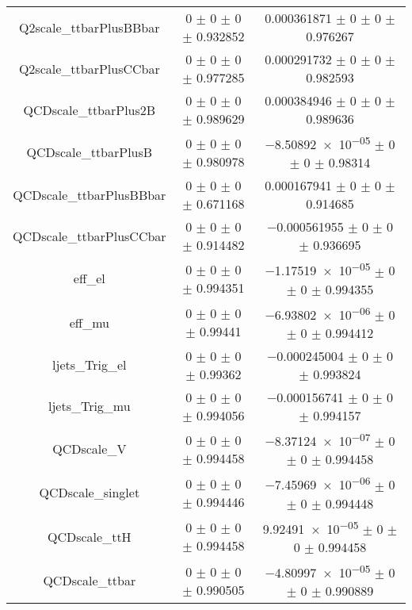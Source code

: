 \begin{table}
\begin{tabular}{ccc}
Q2scale\_ttbarPlusBBbar & \num{0} $\pm$ \num{0} $\pm$ \num{0} $\pm$ \num{0.932852} & \num{0.000361871} $\pm$ \num{0} $\pm$ \num{0} $\pm$ \num{0.976267}\\
Q2scale\_ttbarPlusCCbar & \num{0} $\pm$ \num{0} $\pm$ \num{0} $\pm$ \num{0.977285} & \num{0.000291732} $\pm$ \num{0} $\pm$ \num{0} $\pm$ \num{0.982593}\\
QCDscale\_ttbarPlus2B & \num{0} $\pm$ \num{0} $\pm$ \num{0} $\pm$ \num{0.989629} & \num{0.000384946} $\pm$ \num{0} $\pm$ \num{0} $\pm$ \num{0.989636}\\
QCDscale\_ttbarPlusB & \num{0} $\pm$ \num{0} $\pm$ \num{0} $\pm$ \num{0.980978} & \num{-8.50892e-05} $\pm$ \num{0} $\pm$ \num{0} $\pm$ \num{0.98314}\\
QCDscale\_ttbarPlusBBbar & \num{0} $\pm$ \num{0} $\pm$ \num{0} $\pm$ \num{0.671168} & \num{0.000167941} $\pm$ \num{0} $\pm$ \num{0} $\pm$ \num{0.914685}\\
QCDscale\_ttbarPlusCCbar & \num{0} $\pm$ \num{0} $\pm$ \num{0} $\pm$ \num{0.914482} & \num{-0.000561955} $\pm$ \num{0} $\pm$ \num{0} $\pm$ \num{0.936695}\\
eff\_el & \num{0} $\pm$ \num{0} $\pm$ \num{0} $\pm$ \num{0.994351} & \num{-1.17519e-05} $\pm$ \num{0} $\pm$ \num{0} $\pm$ \num{0.994355}\\
eff\_mu & \num{0} $\pm$ \num{0} $\pm$ \num{0} $\pm$ \num{0.99441} & \num{-6.93802e-06} $\pm$ \num{0} $\pm$ \num{0} $\pm$ \num{0.994412}\\
ljets\_Trig\_el & \num{0} $\pm$ \num{0} $\pm$ \num{0} $\pm$ \num{0.99362} & \num{-0.000245004} $\pm$ \num{0} $\pm$ \num{0} $\pm$ \num{0.993824}\\
ljets\_Trig\_mu & \num{0} $\pm$ \num{0} $\pm$ \num{0} $\pm$ \num{0.994056} & \num{-0.000156741} $\pm$ \num{0} $\pm$ \num{0} $\pm$ \num{0.994157}\\
QCDscale\_V & \num{0} $\pm$ \num{0} $\pm$ \num{0} $\pm$ \num{0.994458} & \num{-8.37124e-07} $\pm$ \num{0} $\pm$ \num{0} $\pm$ \num{0.994458}\\
QCDscale\_singlet & \num{0} $\pm$ \num{0} $\pm$ \num{0} $\pm$ \num{0.994446} & \num{-7.45969e-06} $\pm$ \num{0} $\pm$ \num{0} $\pm$ \num{0.994448}\\
QCDscale\_ttH & \num{0} $\pm$ \num{0} $\pm$ \num{0} $\pm$ \num{0.994458} & \num{9.92491e-05} $\pm$ \num{0} $\pm$ \num{0} $\pm$ \num{0.994458}\\
QCDscale\_ttbar & \num{0} $\pm$ \num{0} $\pm$ \num{0} $\pm$ \num{0.990505} & \num{-4.80997e-05} $\pm$ \num{0} $\pm$ \num{0} $\pm$ \num{0.990889}\\

\end{tabular}
\end{table}
